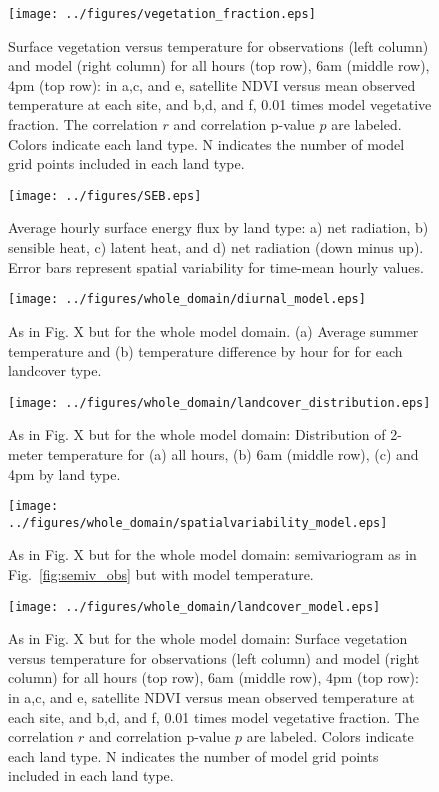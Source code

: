 \documentclass[draft,linenumbers]{agujournal}
\begin{document}
\begin{figure}[h]
\centering
\texttt{[image: ../figures/vegetation\_fraction.eps]}
\caption{Surface vegetation versus temperature for observations (left column) and model (right column) for all hours (top row), 6am (middle row), 4pm (top row): in a,c, and e, satellite NDVI versus mean observed temperature at each site, and b,d, and f, 0.01 times model vegetative fraction. The correlation $r$ and correlation p-value $p$ are labeled. Colors indicate each land type. N indicates the number of model grid points included in each land type.}
\label{fig:veg}
\end{figure}

\begin{figure}[h]
\centering
\texttt{[image: ../figures/SEB.eps]}
\caption{Average hourly surface energy flux by land type: a) net radiation, b) sensible heat, c) latent heat, and d) net radiation (down minus up). Error bars represent spatial variability for time-mean hourly values.}
\label{fig:seb}
\end{figure}

\begin{figure}[h]
\centering
\texttt{[image: ../figures/whole\_domain/diurnal\_model.eps]}
\caption{As in Fig. X but for the whole model domain. (a) Average summer temperature and (b) temperature difference by hour for for each landcover type.}%
\label{fig:diurnal_wd}
\end{figure}

\begin{figure}[h]
\centering
\texttt{[image: ../figures/whole\_domain/landcover\_distribution.eps]}
\caption{As in Fig. X but for the whole model domain: Distribution of 2-meter temperature for (a) all hours, (b) 6am (middle row), (c) and 4pm by land type. }
\label{fig:hist_wd}
\end{figure}

\begin{figure}[h]
\centering
\texttt{[image: ../figures/whole\_domain/spatialvariability\_model.eps]}
\caption{As in Fig. X but for the whole model domain: semivariogram as in Fig.~\ref{fig:semiv_obs} but with model temperature.}
\label{fig:semiv_model_wd}
\end{figure}

\begin{figure}[h]
\centering
\texttt{[image: ../figures/whole\_domain/landcover\_model.eps]}
\caption{As in Fig. X but for the whole model domain:  Surface vegetation versus temperature for observations (left column) and model (right column) for all hours (top row), 6am (middle row), 4pm (top row): in a,c, and e, satellite NDVI versus mean observed temperature at each site, and b,d, and f, 0.01 times model vegetative fraction. The correlation $r$ and correlation p-value $p$ are labeled. Colors indicate each land type. N indicates the number of model grid points included in each land type.}
\label{fig:veg_wd}
\end{figure}
\end{document}
